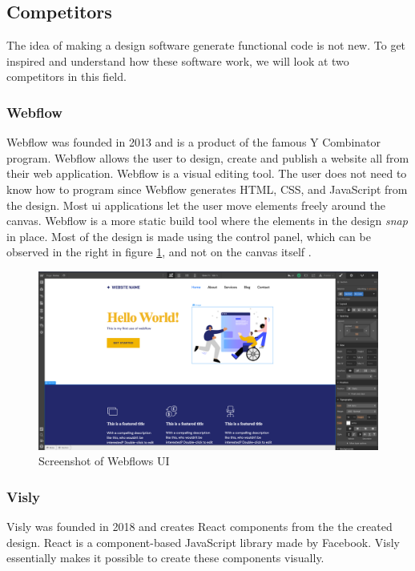 \subsection{Competitors}%
\label{sub:Competitors}
The idea of making a design software generate functional code is not new. To get inspired and understand how these software work, we will look at two competitors in this field. 

\subsubsection{Webflow}
Webflow was founded in 2013 and is a product of the famous Y Combinator program\cite{Combinator}. Webflow allows the user to design, create and publish a website all from their web application. Webflow is a visual editing tool. The user does not need to know how to program since Webflow generates HTML, CSS, and JavaScript from the design. Most \acrshort{ui} applications let the user move elements freely around the canvas. Webflow is a more static build tool where the elements in the design \textit{snap} in place. Most of the design is made using the control panel, which can be observed in the right in figure \ref{fig:webflow}, and not on the canvas itself \cite{ResponsiveWebDesign}. 

\begin{figure}[H]
  \centering
  \includegraphics[width=0.8\linewidth]{images/webflow.png}
  \caption{Screenshot of Webflows UI}%
  \label{fig:webflow}
\end{figure}

\subsubsection{Visly}%
\label{ssub:Visly}
Visly was founded in 2018 and creates React \glspl{component} \cite{facebookincReactJavaScriptLibrary} from the the created design. React is a component-based JavaScript library made by Facebook. Visly essentially makes it possible to create these \glspl{component} visually. 

